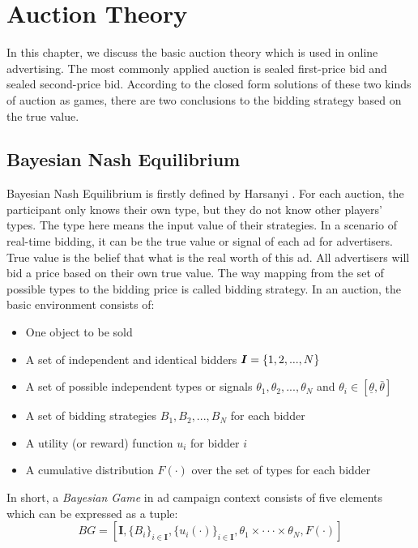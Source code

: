\chapter{Auction Theory}
\label{chapterlabel3}

In this chapter, we discuss the basic auction theory which is used in online advertising. The most commonly applied auction is sealed first-price bid and sealed second-price bid. According to the closed form solutions of these two kinds of auction as games, there are two conclusions to the bidding strategy based on the true value. 

\section{Bayesian Nash Equilibrium}
Bayesian Nash Equilibrium is firstly defined by Harsanyi \cite{johncharsanyi1967}. For each auction, the participant only knows their own type, but they do not know other players' types. The type here means the input value of their strategies. In a scenario of real-time bidding, it can be the true value or signal of each ad for advertisers. True value is the belief that what is the real worth of this ad. All advertisers will bid a price based on their own true value. The way mapping from the set of possible types to the bidding price is called bidding strategy. In an auction, the basic environment consists of:
\begin{itemize}
\item One object to be sold
\item A set of independent and identical bidders $\boldsymbol{I} = \{ 1,2,...,N\}$
\item A set of possible independent types or signals $\theta_1, \theta_2,...,\theta_N$ and $\theta_i \in [\underline{\theta}, \bar{\theta}]$
\item A set of bidding strategies $B_1, B_2,...,B_N$ for each bidder
\item A utility (or reward) function $u_i$ for bidder $i$ 
\item A cumulative distribution $F(\cdot)$ over the set of types for each bidder
\end{itemize}
In  short, a \emph{Bayesian Game} in ad campaign context consists of five elements which can be expressed as a tuple:
\begin{equation}
BG=[\bm{I}, \{ B_i \}_{i \in \bm{I}}, \{ u_{i}(\cdot) \}_{i \in \bm{I}},  \theta_1 \times \cdot \cdot \cdot \times \theta_N, F(\cdot)]
\end{equation}

